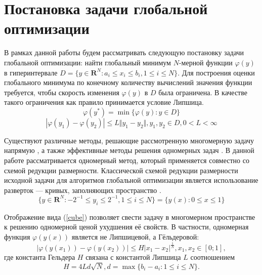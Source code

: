 \documentclass[11pt, oneside, a4paper]{article}
\begin{document}
\section{Постановка задачи глобальной оптимизации}
В рамках данной работы будем рассматривать следующую постановку задачи глобальной
оптимизации: найти глобальный минимум \(N\)-мерной функции \(\varphi(y)\) в гиперинтервале
\(D=\{y\in \mathbf{R}^N:a_i\leqslant x_i\leqslant{b_i}, 1\leqslant{i}\leqslant{N}\}\).
Для построения оценки глобального минимума по конечному количеству вычислений
значения функции требуется, чтобы скорость изменения \(\varphi(y)\) в \(D\) была ограничена.
В качестве такого ограничения как правило принимается условие Липшица.
\begin{equation}
\label{eq:task}
\varphi(y^*)=\min\{\varphi(y):y\in D\}
\end{equation}
\begin{displaymath}
\label{lip}
|\varphi(y_1)-\varphi(y_2)|\leqslant L\Vert y_1-y_2\Vert,y_1,y_2\in D,0<L<\infty
\end{displaymath}

Существуют различные методы, решающие рассмотренную многомерную задачу напрямую \cite{SergeyevKvasov2017, Jones2009},
а также эффективные методы решения одномерных задач \cite{Norkin1992, Strongin2000}. В данной работе рассматривается одномерный метод,
который применяется совместно со схемой редукции размерности.
Классической схемой редукции размерности исходной задачи для алгоритмов глобальной оптимизации является
использование разверток --- кривых, заполняющих пространство \cite{Sergeyev2013}.
\begin{equation}
\label{cube}
\lbrace y\in \mathbf{R}^N:-2^{-1}\leqslant y_i\leqslant 2^{-1},1\leqslant i\leqslant N\rbrace=\{y(x):0\leqslant x\leqslant 1\}
\end{equation}

Отображение вида (\ref{cube}) позволяет свести задачу в многомерном пространстве к решению
одномерной ценой ухудшения её свойств. В частности, одномерная функция \(\varphi(y(x))\)
является не Липшицевой, а Гёльдеровой:
\begin{displaymath}
\label{holder}
|\varphi(y(x_1))-\varphi(y(x_2))|\leqslant H{|x_1-x_2|}^{\frac{1}{N}},x_1,x_2\in[0;1],
\end{displaymath}
где константа Гельдера \(H\) связана с константой Липшица \(L\) соотношением
\begin{displaymath}
H=4Ld\sqrt{N},d=\max\{b_i-a_i:1\leqslant i\leqslant N\}.
\end{displaymath}
\end{document}
